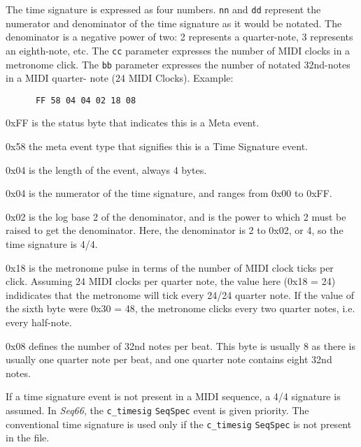    The time signature is expressed as four numbers.
   \texttt{nn} and \texttt{dd} represent the numerator and denominator of the
   time signature as it would be notated.  The denominator is a negative power
   of two:  2 represents a quarter-note, 3 represents an eighth-note, etc.  The
   \texttt{cc} parameter expresses the number of MIDI clocks in a metronome
   click.  The \texttt{bb} parameter expresses the number of notated 32nd-notes
   in a MIDI quarter- note (24 MIDI Clocks).
   Example:

   \begin{verbatim}
      FF 58 04 04 02 18 08
   \end{verbatim}

   \begin{enumber}
      \item 0xFF is the status byte that indicates this is a Meta event.
      \item 0x58 the meta event type that signifies this is a Time Signature
         event.
      \item 0x04 is the length of the event, always 4 bytes.
      \item 0x04 is the numerator of the time signature, and ranges from 0x00
         to 0xFF.
      \item 0x02 is the log base 2 of the denominator, and is the power to
         which 2 must be raised to get the denominator.  Here, the denominator
         is 2 to 0x02, or 4, so the time signature is 4/4.
      \item 0x18 is the metronome pulse in terms of the number of
         MIDI clock ticks per click.  Assuming 24 MIDI clocks per quarter note,
         the value here (0x18 = 24) indidicates that the metronome will tick
         every 24/24 quarter note.  If the value of the sixth byte were 0x30 =
         48, the metronome clicks every two quarter notes, i.e. every
         half-note.
      \item 0x08 defines the number of 32nd notes per beat. This byte is
         usually 8 as there is usually one quarter note per beat, and one
         quarter note contains eight 32nd notes.
   \end{enumber}

   If a time signature event is not present in a MIDI sequence, a 4/4 signature
   is assumed.
   In \textsl{Seq66},
   the \texttt{c\_timesig}
   \texttt{SeqSpec} event is given priority.  The
   conventional time signature is used only if the \texttt{c\_timesig}
  \texttt{SeqSpec} is not present in the file.

